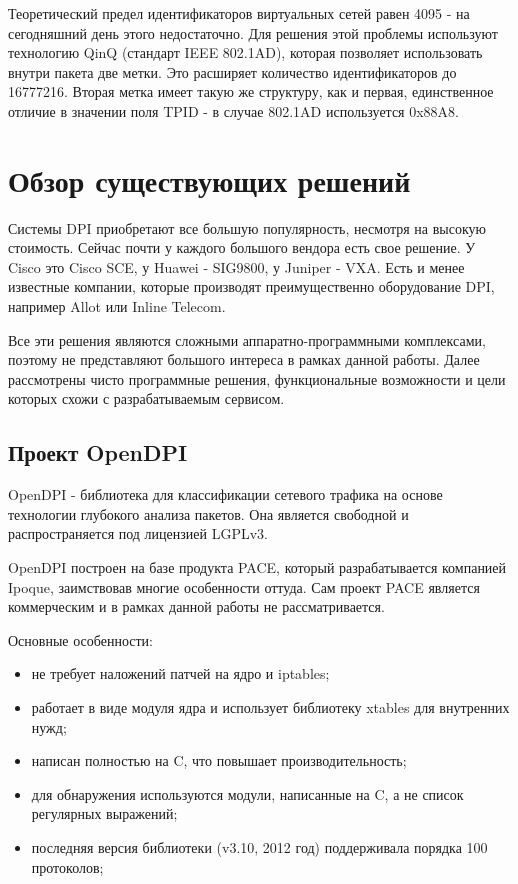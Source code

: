 Теоретический предел идентификаторов виртуальных сетей равен 4095 - на сегодняшний день этого недостаточно. Для решения этой проблемы используют технологию QinQ (стандарт IEEE 802.1AD), которая позволяет использовать внутри пакета две метки. Это расширяет количество идентификаторов до 16777216. Вторая метка имеет такую же структуру, как и первая, единственное отличие в значении поля TPID - в случае 802.1AD используется 0x88A8.


\section{Обзор существующих решений}
Системы DPI приобретают все большую популярность, несмотря на высокую стоимость. Сейчас почти у каждого большого вендора есть свое решение. У Cisco это Cisco SCE, у Huawei - SIG9800, у Juniper - VXA. Есть и менее известные компании, которые производят преимущественно оборудование DPI, например Allot или Inline Telecom.

Все эти решения являются сложными аппаратно-программными комплексами, поэтому не представляют большого интереса в рамках данной работы. Далее рассмотрены чисто программные решения, функциональные возможности  и цели которых схожи с разрабатываемым сервисом.
\subsection{Проект OpenDPI}
OpenDPI - библиотека для классификации сетевого трафика на основе технологии глубокого анализа пакетов. Она является свободной и распространяется под лицензией LGPLv3.

OpenDPI построен на базе продукта PACE, который разрабатывается компанией Ipoque, заимствовав многие особенности оттуда. Сам проект PACE является коммерческим и в рамках данной работы не рассматривается.

Основные особенности:
\begin{itemize}
\item не требует наложений патчей на ядро и iptables;
\item работает в виде модуля ядра и использует библиотеку xtables для внутренних нужд;
\item написан полностью на C, что повышает производительность;
\item для обнаружения используются модули, написанные на C, а не список регулярных выражений;
\item последняя версия библиотеки (v3.10, 2012 год) поддерживала порядка 100 протоколов;
\end{itemize}

